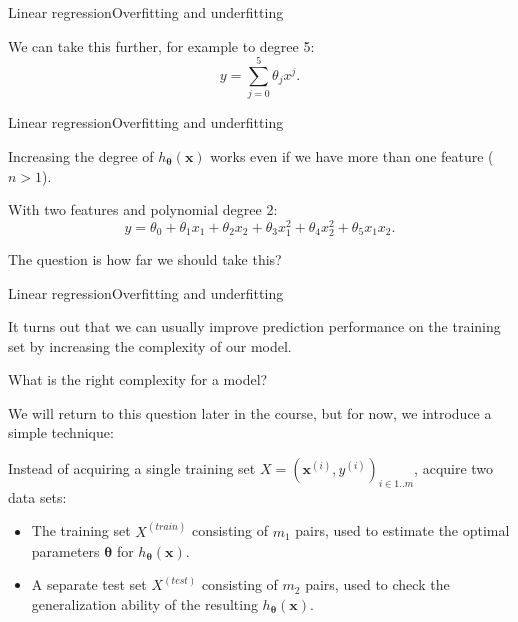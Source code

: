 \documentclass{beamer}
\renewcommand{\vec}[1]{\boldsymbol{#1}}
\begin{document}
\begin{frame}{Linear regression}{Overfitting and underfitting}

  We can take this further, for example to degree 5:
  \[ y = \sum_{j=0}^5 \theta_j x^j .\]

\end{frame}


\begin{frame}{Linear regression}{Overfitting and underfitting}

  Increasing the degree of $h_{\vec{\theta}}(\vec{x})$ works even if
  we have more than one feature ($n > 1$).

  \medskip
  
  With two features and polynomial degree 2:
  \[ y = \theta_0 + \theta_1 x_1 + \theta_2 x_2 + \theta_3 x_1^2 + \theta_4 x_2^2 + \theta_5 x_1 x_2 . \]

  \medskip

  The question is how far we should take this?

\end{frame}


\begin{frame}{Linear regression}{Overfitting and underfitting}

  It turns out that we can usually improve prediction performance on
  the training set by increasing the complexity of our model.

  \medskip
  
  What is the \alert{right} complexity for a model?

  \medskip

  We will return to this question later in the course, but for now,
  we introduce a simple technique:

  \medskip
  
  Instead of acquiring a \alert{single training set} $X =
  (\vec{x}^{(i)},y^{(i)})_{i \in 1..m}$, acquire two data sets:
  \begin{itemize}
  \item The training set $X^{(train)}$ consisting of $m_1$ pairs, used to
    estimate the optimal parameters $\vec{\theta}$ for $h_{\vec{\theta}}(\vec{x})$.
  \item A separate \alert{test set} $X^{(test)}$ consisting of $m_2$ pairs,
    used to check the \alert{generalization} ability of the
    resulting $h_{\vec{\theta}}(\vec{x})$.
  \end{itemize}

\end{frame}
\end{document}
